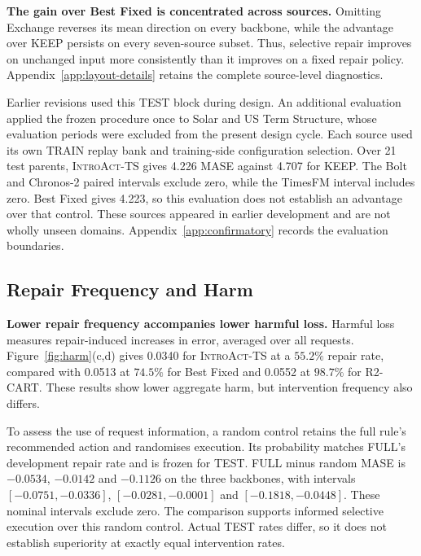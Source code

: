 \documentclass{article}
\newcommand{\introact}{\textsc{IntroAct-TS}}
\begin{document}
\textbf{The gain over Best Fixed is concentrated across sources.} Omitting Exchange reverses its
mean direction on every backbone, while the advantage over KEEP persists on every
seven-source subset. Thus, selective repair improves on unchanged input more consistently
than it improves on a fixed repair policy. Appendix~\ref{app:layout-details} retains
the complete source-level diagnostics.

Earlier revisions used this TEST block during design. An additional evaluation applied
the frozen procedure once to Solar and US Term Structure, whose evaluation periods were
excluded from the present design cycle. Each source used its own TRAIN replay bank and
training-side configuration selection. Over 21 test parents, \introact{} gives 4.226 MASE
against 4.707 for KEEP. The Bolt and Chronos-2 paired intervals exclude zero, while the
TimesFM interval includes zero. Best Fixed gives 4.223, so this evaluation does not establish
an advantage over that control. These sources appeared in earlier development and are not
wholly unseen domains. Appendix~\ref{app:confirmatory} records the evaluation boundaries.

\subsection{Repair Frequency and Harm}
\label{sec:exp-harm}
\textbf{Lower repair frequency accompanies lower harmful loss.} Harmful loss measures repair-induced increases in error, averaged over all requests.
Figure~\ref{fig:harm}(c,d) gives 0.0340 for \introact{} at a $55.2\%$ repair rate,
compared with 0.0513 at $74.5\%$ for Best Fixed and 0.0552 at $98.7\%$ for R2-CART.
These results show lower aggregate harm, but intervention frequency also differs.

To assess the use of request information, a random control retains the full rule's
recommended action and randomises execution. Its probability matches FULL's development
repair rate and is frozen for TEST. FULL minus random MASE is $-0.0534$, $-0.0142$ and
$-0.1126$ on the three backbones, with intervals $[-0.0751,-0.0336]$,
$[-0.0281,-0.0001]$ and $[-0.1818,-0.0448]$. These nominal intervals exclude zero.
The comparison supports informed selective execution over this random control. Actual TEST rates differ,
so it does not establish superiority at exactly equal intervention rates.
\end{document}
